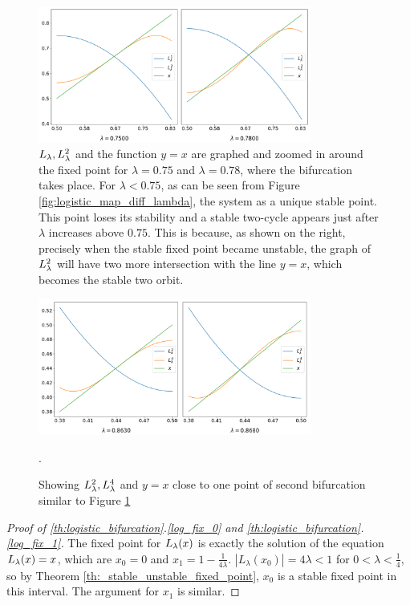 \begin{figure}[htbp]
	\centering
	\includegraphics[width=0.8\textwidth]{./figures/logistic_map_around_bifurcation.png}
	\caption{
		$L_{\lambda}, L_{\lambda}^2$ and the function $y=x$ are graphed and zoomed in around the fixed point for $\lambda = 0.75$ and $\lambda = 0.78$, where the bifurcation takes place.
		For $\lambda < 0.75$, as can be seen from Figure \ref{fig:logistic_map_diff_lambda}, the system as a unique stable point. This point loses its stability and a stable two-cycle appears just after $\lambda$ increases above $0.75$.
		This is because, as shown on the right, precisely when the stable fixed point became unstable, the graph of $L_{\lambda}^2$ will have two more intersection with the line $y=x$, which becomes the stable two orbit.
	}
	\label{fig:point_of_bifurcation1}
\end{figure}

\begin{figure}[htbp]
	\centering
	\includegraphics[width=0.8\textwidth]{./figures/logistic_map_around_bifurcation_2.png}
	\caption{Showing $L_{\lambda}^2, L_{\lambda}^4$ and $y=x$ close to one point of second bifurcation similar to Figure \ref{fig:point_of_bifurcation1}}.
	\label{fig:point_of_bifurcation2}
\end{figure}

\begin{proof}[Proof of \ref{th:logistic_bifurcation}.\ref{log_fix_0} and \ref{th:logistic_bifurcation}.\ref{log_fix_1}]
	The fixed point for $L_{\lambda}(x)$ is exactly the solution of the equation $L_{\lambda}(x) = x$, which are $x_0 = 0$ and $x_1 = 1 - \frac{1}{4\lambda}$. 
	$|L_{\lambda}(x_0) | = 4 \lambda < 1$ for $0 < \lambda < \frac{1}{4}$, so by Theorem \ref{th:_stable_unstable_fixed_point}, $x_0$ is a stable fixed point in this interval.
	The argument for $x_1$ is similar.
\end{proof}

